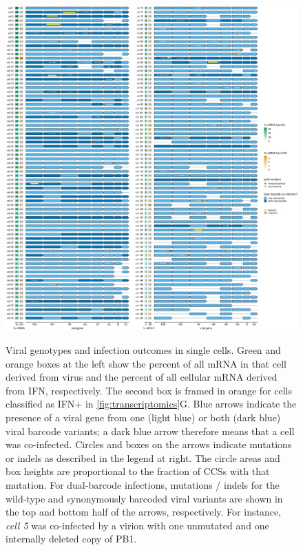 \documentclass[]{asm-article}
\newcommand{\FIG}[1]{\autoref{fig:#1}}
\begin{document}
\begin{figure}
\begin{fullwidth}
{\centering
\includegraphics[height=0.85\textheight]{figures/single_cell_figures/p_genotypes.pdf}
}
\caption{
Viral genotypes and infection outcomes in single cells.
Green and orange boxes at the left show the percent of all mRNA in that cell derived from virus and the percent of all cellular mRNA derived from IFN, respectively.
The second box is framed in orange for cells classified as IFN+ in \FIG{transcriptomics}G.
Blue arrows indicate the presence of a viral gene from one (light blue) or both (dark blue) viral barcode variants; a dark blue arrow therefore means that a cell was co-infected.
Circles and boxes on the arrows indicate mutations or indels as described in the legend at right.
The circle areas and box heights are proportional to the fraction of CCSs with that mutation.
For dual-barcode infections, mutations / indels for the wild-type and synonymously barcoded viral variants are shown in the top and bottom half of the arrows, respectively.
For instance, \textit{cell 5} was co-infected by a virion with one unmutated and one internally deleted copy of PB1.
}
\label{fig:genotypes}

\end{fullwidth}
\end{figure}
\end{document}
